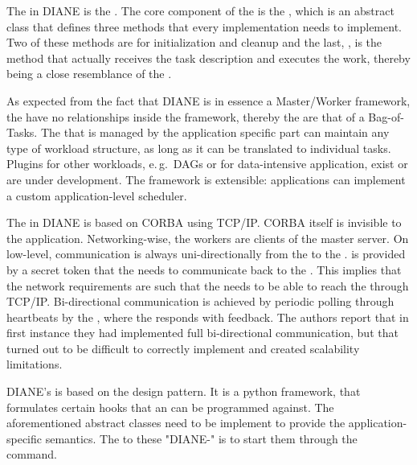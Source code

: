 \documentclass{sig-alternate}
\begin{document}
The \vocab{\pilot} in DIANE is the .
The core component of the  is the
, which is an abstract class that defines three
methods that every implementation needs to implement.
Two of these methods are for initialization and cleanup and the last,
, is the method that actually receives the task description
and executes the work, thereby being a close resemblance of the .

As expected from the fact that DIANE is in essence a Master/Worker framework,
the  have no relationships inside the framework, thereby
the  are that of a Bag-of-Tasks.
The  that is managed by the application specific part can
maintain any type of workload structure, as long as it can be translated to
individual tasks\cite{diane-dag, diane-etc}.
Plugins for other workloads, e.\,g.\ DAGs or for data-intensive
application, exist or are under development. The framework is extensible:
applications can implement a custom application-level scheduler.

The  in DIANE is based on CORBA using
TCP/IP.
CORBA itself is invisible to the application.
Networking-wise, the workers are clients of the master server.
On low-level, communication is always uni-directionally from the
 to the .
 is provided by a secret token that the 
needs to communicate back to the .
This implies that the network requirements are such that the
 needs to be able to reach the  through
TCP/IP.
Bi-directional communication is achieved by periodic polling through
heartbeats by the , where the  responds
with feedback.
The authors report that in first instance they had implemented full
bi-directional communication, but that turned out to be difficult to correctly
implement and created scalability limitations.

DIANE's  is based on the 
design pattern.
It is a python framework, that formulates certain hooks that an
 can be programmed against. The aforementioned abstract
classes need to be implement to provide the application-specific semantics.
The  to these "DIANE-" is to start them
through the  command.
\end{document}
